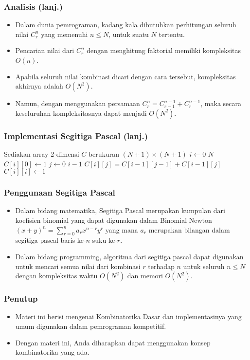 \begin{frame}
\frametitle{Analisis (lanj.)}
\begin{itemize}
  \item Dalam dunia pemrograman, kadang kala dibutuhkan perhitungan seluruh nilai $C^{n}_{r}$ yang memenuhi $n \le N$, untuk suatu $N$ tertentu.
  \item Pencarian nilai dari $C^{n}_{r}$ dengan menghitung faktorial memiliki kompleksitas $O(n)$.
  \item Apabila seluruh nilai kombinasi dicari dengan cara tersebut, kompleksitas akhirnya adalah $O(N^3)$.
  \item Namun, dengan menggunakan persamaan $C^{n}_{r} = C^{n-1}_{r-1} + C^{n-1}_{r}$, maka secara keseluruhan kompleksitasnya dapat menjadi $O(N^{2})$.
\end{itemize}
\end{frame}

\begin{frame}[fragile]
\frametitle{Implementasi Segitiga Pascal (lanj.)}
\begin{codebox}
\li \Comment Sediakan array 2-dimensi $C$ berukuran $(N+1) \times (N+1)$
\li \For $i \gets 0$ \To $N$
    \Do
\li   $C[i][0] \gets 1$
\li   \For $j \gets 0$ \To $i-1$
      \Do
\li     $C[i][j] = C[i-1][j-1] + C[i-1][j]$
      \End
\li   $C[i][i] \gets 1$
    \End
\end{codebox}
\end{frame}

\begin{frame}
\frametitle{Penggunaan Segitiga Pascal}
\begin{itemize}
  \item Dalam bidang matematika, Segitiga Pascal merupakan kumpulan dari koefisien binomial yang dapat digunakan dalam Binomial Newton $(x+y)^{n} = \sum\limits_{r=0}^{n} a_{r} x^{n-r} y^{r}$ yang mana $a_{r}$ merupakan bilangan dalam segitiga pascal baris ke-$n$ suku ke-$r$.
  \item Dalam bidang programming, algoritma dari segitiga pascal dapat digunakan untuk mencari semua nilai dari kombinasi $r$ terhadap $n$ untuk seluruh $n \le N$ dengan kompleksitas waktu $O(N^{2})$ dan memori $O(N^{2})$.
\end{itemize}
\end{frame}

\begin{frame}
\frametitle{Penutup}
\begin{itemize}
  \item Materi ini berisi mengenai Kombinatorika Dasar dan implementasinya yang umum digunakan dalam pemrograman kompetitif.
  \item Dengan materi ini, Anda diharapkan dapat menggunakan konsep kombinatorika yang ada.
\end{itemize}
\end{frame}


